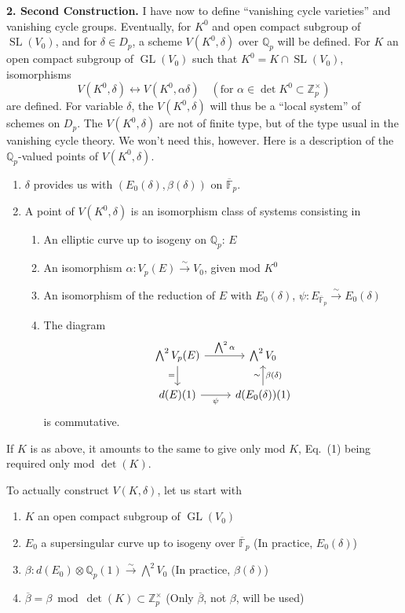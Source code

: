 \documentclass[11pt,a4paper]{article}
\theoremstyle{plain}
\theoremstyle{definition}
\theoremstyle{remark}
\DeclareMathOperator{\GL}{GL}
\DeclareMathOperator{\SL}{SL}
\newcommand{\Z}{\mathbb{Z}}
\newcommand{\Fpbar}{\overline{\mathbb{F}}_{p}}
\newcommand{\Qp}{\mathbb{Q}_{p}}
\newcommand{\Vp}{V_{p}}
\begin{document}
\medskip

\noindent
\textbf{2. Second Construction.} I have now to define ``vanishing cycle varieties'' and vanishing cycle groups. Eventually, for $K^{0}$ and open compact subgroup of $\SL(V_{0})$, and for $\delta \in D_{p}$, a scheme $V(K^{0}, \delta)$ over $\Qp$ will be defined. For $K$ an open compact subgroup of $\GL(V_{0})$ such that $K^{0} = K \cap \SL(V_{0})$, isomorphisms
\[
V(K^{0}, \delta) \leftrightarrow V(K^{0}, \alpha\delta) \quad (\text{for } \alpha \in \det K^{0} \subset \Z_{p}^{\times})
\]
are defined. For variable $\delta$, the $V(K^{0}, \delta)$ will thus be a ``local system'' of schemes on $D_{p}$. The $V(K^{0}, \delta)$ are not of finite type, but of the type usual in the vanishing cycle theory. We won't need this, however. Here is a description of the $\Qp$-valued points of $V(K^{0}, \delta)$.
\begin{enumerate}[label=(\alph*)]
\item $\delta$ provides us with $(E_{0}(\delta), \beta(\delta))$ on $\Fpbar$.
\item A point of $V(K^{0}, \delta)$ is an isomorphism class of systems consisting in
\begin{enumerate}[label=(\arabic*)]
\item An elliptic curve up to isogeny on $\Qp$: $E$
\item An isomorphism $\alpha : \Vp(E) \xrightarrow{\sim} V_{0}$, given mod $K^{0}$
\item An isomorphism of the reduction of $E$ with $E_{0}(\delta)$, $\psi : E_{\Fpbar} \xrightarrow{\sim} E_{0}(\delta)$
\item The diagram
\[
\begin{tikzcd}
\bigwedge^{2} \Vp(E) \arrow[r, "{\bigwedge^{2} \alpha}"] \arrow[d, "{=}"'] & \bigwedge^{2} V_{0} \\
d(E)(1) \arrow[r, "\psi"'] & d(E_{0}(\delta))(1) \arrow[u, "{\beta(\delta)}"', "{\sim}"]
\end{tikzcd}
\]
is commutative.
\end{enumerate}
\end{enumerate}
If $K$ is as above, it amounts to the same to give only mod $K$, Eq.\ (1) being required only mod $\det(K)$.

To actually construct $V(K, \delta)$, let us start with
\begin{enumerate}[label=(\alph*)]
\item $K$ an open compact subgroup of $\GL(V_{0})$
\item $E_{0}$ a supersingular curve up to isogeny over $\Fpbar$ (In practice, $E_{0}(\delta)$)
\item $\beta : d(E_{0}) \otimes \Qp(1) \xrightarrow{\sim} \bigwedge^{2} V_{0}$ (In practice, $\beta(\delta)$)
\item $\overline{\beta} = \beta \bmod \det(K) \subset \Z_{p}^{\times}$ (Only $\overline{\beta}$, not $\beta$, will be used)
\end{enumerate}
\end{document}
